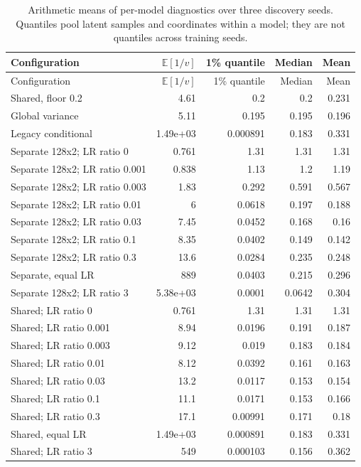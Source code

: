 \documentclass[11pt,a4paper]{article}
\newcommand{\E}{\mathbb E}
\begin{document}
{\small
\begin{longtable}{@{}>{\raggedright\arraybackslash}p{6.5cm}rrrr@{}}
\caption{Arithmetic means of per-model diagnostics over three discovery seeds. Quantiles pool latent samples and coordinates within a model; they are not quantiles across training seeds.}\\
\toprule
Configuration & $\E[1/v]$ & 1\% quantile & Median & Mean \\ \midrule
\endfirsthead
\toprule
Configuration & $\E[1/v]$ & 1\% quantile & Median & Mean \\ \midrule
\endhead
Shared, floor 0.2 & 4.61 & 0.2 & 0.2 & 0.231 \\
Global variance & 5.11 & 0.195 & 0.195 & 0.196 \\
Legacy conditional & 1.49e+03 & 0.000891 & 0.183 & 0.331 \\
Separate 128x2; LR ratio 0 & 0.761 & 1.31 & 1.31 & 1.31 \\
Separate 128x2; LR ratio 0.001 & 0.838 & 1.13 & 1.2 & 1.19 \\
Separate 128x2; LR ratio 0.003 & 1.83 & 0.292 & 0.591 & 0.567 \\
Separate 128x2; LR ratio 0.01 & 6 & 0.0618 & 0.197 & 0.188 \\
Separate 128x2; LR ratio 0.03 & 7.45 & 0.0452 & 0.168 & 0.16 \\
Separate 128x2; LR ratio 0.1 & 8.35 & 0.0402 & 0.149 & 0.142 \\
Separate 128x2; LR ratio 0.3 & 13.6 & 0.0284 & 0.235 & 0.248 \\
Separate, equal LR & 889 & 0.0403 & 0.215 & 0.296 \\
Separate 128x2; LR ratio 3 & 5.38e+03 & 0.0001 & 0.0642 & 0.304 \\
Shared; LR ratio 0 & 0.761 & 1.31 & 1.31 & 1.31 \\
Shared; LR ratio 0.001 & 8.94 & 0.0196 & 0.191 & 0.187 \\
Shared; LR ratio 0.003 & 9.12 & 0.019 & 0.183 & 0.184 \\
Shared; LR ratio 0.01 & 8.12 & 0.0392 & 0.161 & 0.163 \\
Shared; LR ratio 0.03 & 13.2 & 0.0117 & 0.153 & 0.154 \\
Shared; LR ratio 0.1 & 11.1 & 0.0171 & 0.153 & 0.166 \\
Shared; LR ratio 0.3 & 17.1 & 0.00991 & 0.171 & 0.18 \\
Shared, equal LR & 1.49e+03 & 0.000891 & 0.183 & 0.331 \\
Shared; LR ratio 3 & 549 & 0.000103 & 0.156 & 0.362 \\

\end{longtable}}
\end{document}
